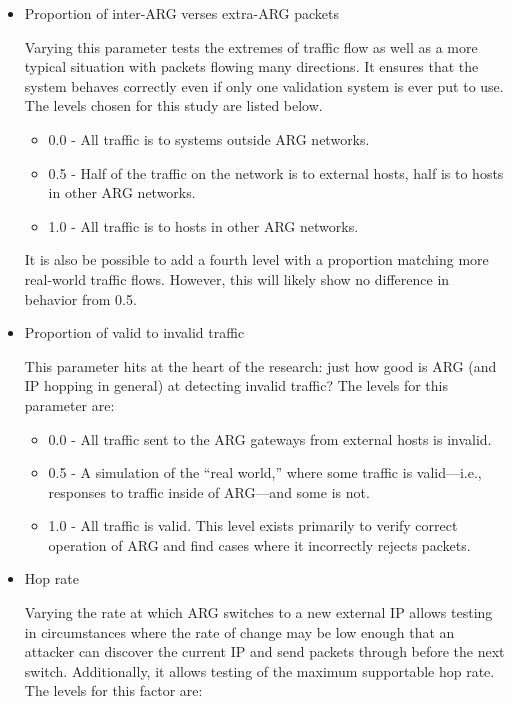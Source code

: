 \begin{itemize}
\item Proportion of inter-ARG verses extra-ARG packets
	\par Varying this parameter tests the extremes of traffic flow as well as a more typical situation with packets flowing many directions. It ensures that the system behaves correctly even if only one validation system  is ever put to use. The levels chosen for this study are listed below.

		\begin{itemize}
		\item 0.0 - All traffic is to systems outside \ac{ARG} networks.

		\item 0.5 - Half of the traffic on the network is to external hosts, half is to hosts in other \ac{ARG} networks. 

		\item 1.0 - All traffic is to hosts in other \ac{ARG} networks.
		\end{itemize}

	\par It is also be possible to add a fourth level with a proportion matching more real-world traffic flows. However, this will likely show no difference in behavior from 0.5.

\item Proportion of valid to invalid traffic
	\par This parameter hits at the heart of the research: just how good is \ac{ARG} (and \ac{IP} hopping in general) at detecting invalid traffic? The levels for this parameter are:
		\begin{itemize}
		\item 0.0 - All traffic sent to the \ac{ARG} gateways from external hosts is invalid.

		\item 0.5 - A simulation of the ``real world,'' where some traffic is valid---i.e., responses to traffic inside of \ac{ARG}---and some is not. 

		\item 1.0 - All traffic is valid. This level exists primarily to verify correct operation of \ac{ARG} and find cases where it incorrectly rejects packets.
		\end{itemize}

\item Hop rate
	\par Varying the rate at which \ac{ARG} switches to a new external \ac{IP} allows testing in circumstances where the rate of change may be low enough that an attacker can discover the current \ac{IP} and send packets through before the next switch. Additionally, it allows testing of the maximum supportable hop rate. The levels for this factor are:


\end{itemize}
